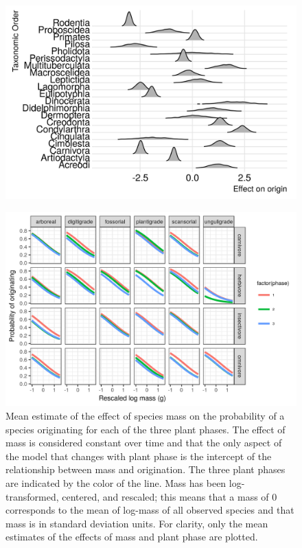 \documentclass[12pt,letterpaper]{article}
\begin{document}
\begin{figure}[ht]
  \centering
  \includegraphics[width=\textwidth,height=0.4\textheight,keepaspectratio=true]{figure/order_origin_bd}
  \caption{}
  \label{fig:order_origin}
\end{figure}

\begin{figure}[ht]
  \centering
  \includegraphics[width=\textwidth,height=0.4\textheight,keepaspectratio=true]{figure/mass_on_origin_bd}
  \caption[Effect of mass on probability of species origination as estimated from the birth-death model]{Mean estimate of the effect of species mass on the probability of a species originating for each of the three plant phases. The effect of mass is considered constant over time and that the only aspect of the model that changes with plant phase is the intercept of the relationship between mass and origination. The three plant phases are indicated by the color of the line. Mass has been log-transformed, centered, and rescaled; this means that a mass of 0 corresponds to the mean of log-mass of all observed species and that mass is in standard deviation units. For clarity, only the mean estimates of the effects of mass and plant phase are plotted.}
  \label{fig:mass_origin}
\end{figure}
\end{document}
